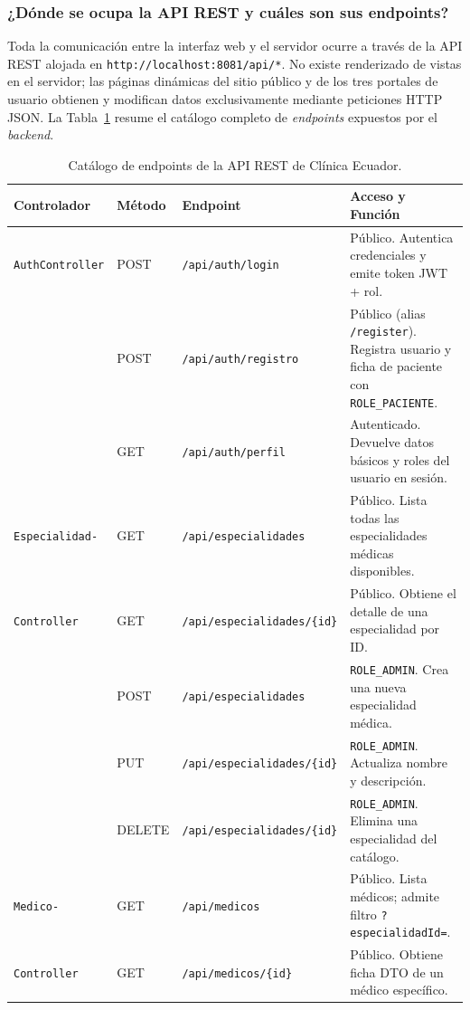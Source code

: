 \documentclass{article}
\begin{document}
\subsubsection{¿Dónde se ocupa la API REST y cuáles son sus endpoints?}
Toda la comunicación entre la interfaz web y el servidor ocurre a través de la API REST alojada en \texttt{http://localhost:8081/api/*}. No existe renderizado de vistas en el servidor; las páginas dinámicas del sitio público y de los tres portales de usuario obtienen y modifican datos exclusivamente mediante peticiones HTTP JSON. La Tabla~\ref{tab:endpoints} resume el catálogo completo de \textit{endpoints} expuestos por el \textit{backend}.

\begin{table}[H]
\centering
\caption{Catálogo de endpoints de la API REST de Clínica Ecuador.}
\label{tab:endpoints}
\scriptsize
\begin{tabularx}{\textwidth}{@{} l l l X @{}}
\toprule
\textbf{Controlador} & \textbf{Método} & \textbf{Endpoint} & \textbf{Acceso y Función} \\
\midrule
\texttt{AuthController} & POST & \texttt{/api/auth/login} & Público. Autentica credenciales y emite token JWT + rol. \\
& POST & \texttt{/api/auth/registro} & Público (alias \texttt{/register}). Registra usuario y ficha de paciente con \texttt{ROLE\_PACIENTE}. \\
& GET & \texttt{/api/auth/perfil} & Autenticado. Devuelve datos básicos y roles del usuario en sesión. \\
\midrule
\texttt{Especialidad-} & GET & \texttt{/api/especialidades} & Público. Lista todas las especialidades médicas disponibles. \\
\texttt{Controller} & GET & \texttt{/api/especialidades/\{id\}} & Público. Obtiene el detalle de una especialidad por ID. \\
& POST & \texttt{/api/especialidades} & \texttt{ROLE\_ADMIN}. Crea una nueva especialidad médica. \\
& PUT & \texttt{/api/especialidades/\{id\}} & \texttt{ROLE\_ADMIN}. Actualiza nombre y descripción. \\
& DELETE & \texttt{/api/especialidades/\{id\}} & \texttt{ROLE\_ADMIN}. Elimina una especialidad del catálogo. \\
\midrule
\texttt{Medico-} & GET & \texttt{/api/medicos} & Público. Lista médicos; admite filtro \texttt{?especialidadId=}. \\
\texttt{Controller} & GET & \texttt{/api/medicos/\{id\}} & Público. Obtiene ficha DTO de un médico específico. \\

\end{tabularx}
\end{table}
\end{document}
